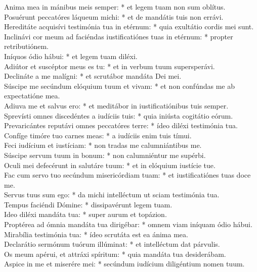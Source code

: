 {	Anima mea in mánibus meis semper: * et legem tuam non sum oblítus. \\
	Posuérunt peccatóres láqueum michi: * et de mandátis tuis non errávi. \\
	Hereditáte acquisívi testimónia tua in etérnum: * quia exultátio cordis mei sunt. \\
	Inclinávi cor meum ad faciéndas iustificatiónes tuas in etérnum: * propter retributiónem. \\
	Iníquos ódio hábui: * et legem tuam diléxi. \\
	Adiútor et suscéptor meus es tu: * et in verbum tuum supersperávi. \\
	Declináte a me malígni: * et scrutábor mandáta Dei mei. \\
	Súscipe me secúndum elóquium tuum et vivam: * et non confúndas me ab expectatióne mea. \\
	Adiuva me et salvus ero: * et meditábor in iustificatiónibus tuis semper. \\
	Sprevísti omnes discedéntes a iudíciis tuis: * quia iniústa cogitátio eórum. \\
	Prevaricántes reputávi omnes peccatóres terre: * ídeo diléxi testimónia tua. \\
	Confíge timóre tuo carnes meas: * a iudíciis enim tuis tímui. \\
	Feci iudícium et iustíciam: * non tradas me calumniántibus me. \\
	Súscipe servum tuum in bonum: * non calumniéntur me supérbi. \\
	Oculi mei defecérunt in salutáre tuum: * et in elóquium iustície tue. \\
	Fac cum servo tuo secúndum misericórdiam tuam: * et iustificatiónes tuas doce me. \\
	Servus tuus sum ego: * da michi intelléctum ut sciam testimónia tua. \\
	Tempus faciéndi Dómine: * dissipavérunt legem tuam. \\
	Ideo diléxi mandáta tua: * super aurum et topázion. \\
	Proptérea ad ómnia mandáta tua dirigébar: * omnem viam iníquam ódio hábui. \\
	Mirabília testimónia tua: * ídeo scrutáta est ea ánima mea. \\
	Declarátio sermónum tuórum illúminat: * et intelléctum dat párvulis. \\
	Os meum apérui, et attráxi spíritum: * quia mandáta tua desiderábam. \\
	Aspice in me et miserére mei: * secúndum iudícium diligéntium nomen tuum. \\
}
